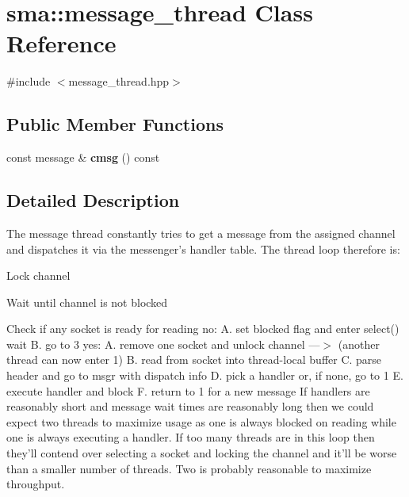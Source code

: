\hypertarget{classsma_1_1message__thread}{\section{sma\-:\-:message\-\_\-thread Class Reference}
\label{classsma_1_1message__thread}
}


{\ttfamily \#include $<$message\-\_\-thread.\-hpp$>$}

\subsection*{Public Member Functions}
\begin{DoxyCompactItemize}
\item 
\hypertarget{classsma_1_1message__thread_ae2bf5e0973518dfffdd9832a9bd4296e}{const message \& {\bfseries cmsg} () const }\label{classsma_1_1message__thread_ae2bf5e0973518dfffdd9832a9bd4296e}

\end{DoxyCompactItemize}


\subsection{Detailed Description}
The message thread constantly tries to get a message from the assigned channel and dispatches it via the messenger's handler table. The thread loop therefore is\-:
\begin{DoxyEnumerate}
\item Lock channel
\item Wait until channel is not blocked
\item Check if any socket is ready for reading no\-: A. set blocked flag and enter select() wait B. go to 3 yes\-: A. remove one socket and unlock channel ---$>$ (another thread can now enter 1) B. read from socket into thread-\/local buffer C. parse header and go to msgr with dispatch info D. pick a handler or, if none, go to 1 E. execute handler and block F. return to 1 for a new message If handlers are reasonably short and message wait times are reasonably long then we could expect two threads to maximize usage as one is always blocked on reading while one is always executing a handler. If too many threads are in this loop then they'll contend over selecting a socket and locking the channel and it'll be worse than a smaller number of threads. Two is probably reasonable to maximize throughput.
\end{DoxyEnumerate}

